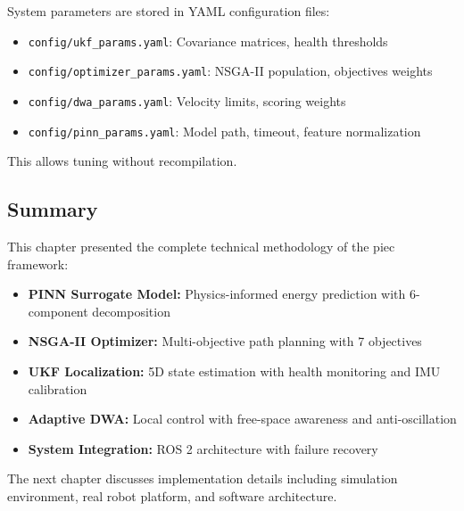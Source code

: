 System parameters are stored in YAML configuration files:
\begin{itemize}
    \item \texttt{config/ukf\_params.yaml}: Covariance matrices, health thresholds
    \item \texttt{config/optimizer\_params.yaml}: NSGA-II population, objectives weights
    \item \texttt{config/dwa\_params.yaml}: Velocity limits, scoring weights
    \item \texttt{config/pinn\_params.yaml}: Model path, timeout, feature normalization
\end{itemize}

This allows tuning without recompilation.


\subsection{Summary}

This chapter presented the complete technical methodology of the \acrshort{piec} framework:
\begin{itemize}
    \item \textbf{PINN Surrogate Model:} Physics-informed energy prediction with 6-component decomposition
    \item \textbf{NSGA-II Optimizer:} Multi-objective path planning with 7 objectives
    \item \textbf{UKF Localization:} 5D state estimation with health monitoring and IMU calibration
    \item \textbf{Adaptive DWA:} Local control with free-space awareness and anti-oscillation
    \item \textbf{System Integration:} ROS 2 architecture with failure recovery
\end{itemize}

The next chapter discusses implementation details including simulation environment, real robot platform, and software architecture.

